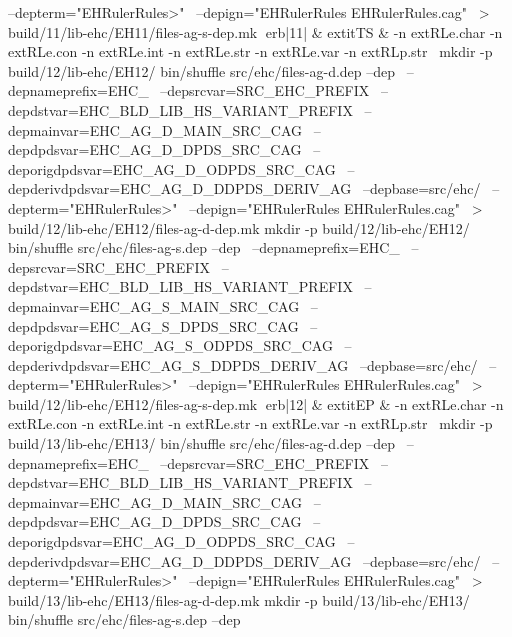 	  --depterm="EHRulerRules>" \
	  --depign="EHRulerRules EHRulerRules.cag" \
	    > build/11/lib-ehc/EH11/files-ag-s-dep.mk
erb|11| & 	extit{TS} & 
-n 	extRL{e.char}\hspace{.5em} 
-n 	extRL{e.con}\hspace{.5em} 
-n 	extRL{e.int}\hspace{.5em} 
-n 	extRL{e.str}\hspace{.5em} 
-n 	extRL{e.var}\hspace{.5em} 
-n 	extRL{p.str}\hspace{.5em} 
\
mkdir -p build/12/lib-ehc/EH12/
bin/shuffle src/ehc/files-ag-d.dep --dep \
	  --depnameprefix=EHC_ \
	  --depsrcvar=SRC_EHC_PREFIX \
	  --depdstvar=EHC_BLD_LIB_HS_VARIANT_PREFIX \
	  --depmainvar=EHC_AG_D_MAIN_SRC_CAG \
	  --depdpdsvar=EHC_AG_D_DPDS_SRC_CAG \
	  --deporigdpdsvar=EHC_AG_D_ODPDS_SRC_CAG \
	  --depderivdpdsvar=EHC_AG_D_DDPDS_DERIV_AG \
	  --depbase=src/ehc/ \
	  --depterm="EHRulerRules>" \
	  --depign="EHRulerRules EHRulerRules.cag" \
	    > build/12/lib-ehc/EH12/files-ag-d-dep.mk
mkdir -p build/12/lib-ehc/EH12/
bin/shuffle src/ehc/files-ag-s.dep --dep \
	  --depnameprefix=EHC_ \
	  --depsrcvar=SRC_EHC_PREFIX \
	  --depdstvar=EHC_BLD_LIB_HS_VARIANT_PREFIX \
	  --depmainvar=EHC_AG_S_MAIN_SRC_CAG \
	  --depdpdsvar=EHC_AG_S_DPDS_SRC_CAG \
	  --deporigdpdsvar=EHC_AG_S_ODPDS_SRC_CAG \
	  --depderivdpdsvar=EHC_AG_S_DDPDS_DERIV_AG \
	  --depbase=src/ehc/ \
	  --depterm="EHRulerRules>" \
	  --depign="EHRulerRules EHRulerRules.cag" \
	    > build/12/lib-ehc/EH12/files-ag-s-dep.mk
erb|12| & 	extit{EP} & 
-n 	extRL{e.char}\hspace{.5em} 
-n 	extRL{e.con}\hspace{.5em} 
-n 	extRL{e.int}\hspace{.5em} 
-n 	extRL{e.str}\hspace{.5em} 
-n 	extRL{e.var}\hspace{.5em} 
-n 	extRL{p.str}\hspace{.5em} 
\
mkdir -p build/13/lib-ehc/EH13/
bin/shuffle src/ehc/files-ag-d.dep --dep \
	  --depnameprefix=EHC_ \
	  --depsrcvar=SRC_EHC_PREFIX \
	  --depdstvar=EHC_BLD_LIB_HS_VARIANT_PREFIX \
	  --depmainvar=EHC_AG_D_MAIN_SRC_CAG \
	  --depdpdsvar=EHC_AG_D_DPDS_SRC_CAG \
	  --deporigdpdsvar=EHC_AG_D_ODPDS_SRC_CAG \
	  --depderivdpdsvar=EHC_AG_D_DDPDS_DERIV_AG \
	  --depbase=src/ehc/ \
	  --depterm="EHRulerRules>" \
	  --depign="EHRulerRules EHRulerRules.cag" \
	    > build/13/lib-ehc/EH13/files-ag-d-dep.mk
mkdir -p build/13/lib-ehc/EH13/
bin/shuffle src/ehc/files-ag-s.dep --dep \

